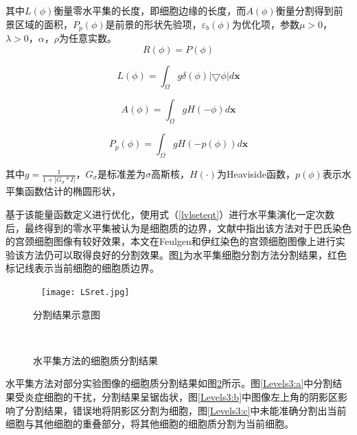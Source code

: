 \documentclass[nomlist,masters]{seuthesix}
\begin{document}
其中$L(\phi)$衡量零水平集的长度，即细胞边缘的长度，而$A(\phi)$衡量分割得到前景区域的面积，$P_{p}({\phi})$是前景的形状先验项，$\varepsilon _{b}(\phi)$为优化项，参数$\mu>0$，$\lambda>0$，$\alpha$，$\rho$为任意实数。
\begin{equation}
R(\phi  )=P(\phi   )
\end{equation}

\begin{equation}
L(\phi  )=\int_{\Omega }g\delta (\phi  )|\bigtriangledown \phi  |d\mathbf{x}
\end{equation}

\begin{equation}
A(\phi  )=\int_{\Omega }gH (-\phi  )d\mathbf{x}
\end{equation}

\begin{equation}
P_{p}({\phi})=\int_{\Omega }gH(-p({\phi}))d\mathbf{x}
\end{equation}

其中$g=\frac{1}{1+ \left | G_{\sigma }\ast I \right |}$，$G_{\sigma }$是标准差为$\sigma$高斯核，$H(\cdot )$为Heaviside函数，$p({\phi})$表示水平集函数估计的椭圆形状，


基于该能量函数定义进行优化，使用式（\ref{lvlseteqt}）进行水平集演化一定次数后，最终得到的零水平集被认为是细胞质的边界，文献中指出该方法对于巴氏染色的宫颈细胞图像有较好效果，本文在Feulgen和伊红染色的宫颈细胞图像上进行实验该方法仍可以取得良好的分割效果。图\ref{Levels2}为水平集细胞分割方法分割结果，红色标记线表示当前细胞的细胞质边界。

\begin{figure}[H]
\centering 
\texttt{[image: LSret.jpg]}
\caption{分割结果示意图}
\label{Levels2}
\end{figure}


\begin{figure}[H]
\centering 
\hspace{0.01\textwidth}
\hspace{0.01\textwidth}
\caption{水平集方法的细胞质分割结果}
\label{Levels3}
\end{figure}
水平集方法对部分实验图像的细胞质分割结果如图\ref{Levels3}所示。图\ref{Levels3:a}中分割结果受炎症细胞的干扰，分割结果呈锯齿状，图\ref{Levels3:b}中图像左上角的阴影区影响了分割结果，错误地将阴影区分割为细胞，图\ref{Levels3:c}中未能准确分割出当前细胞与其他细胞的重叠部分，将其他细胞的细胞质分割为当前细胞。
\end{document}

